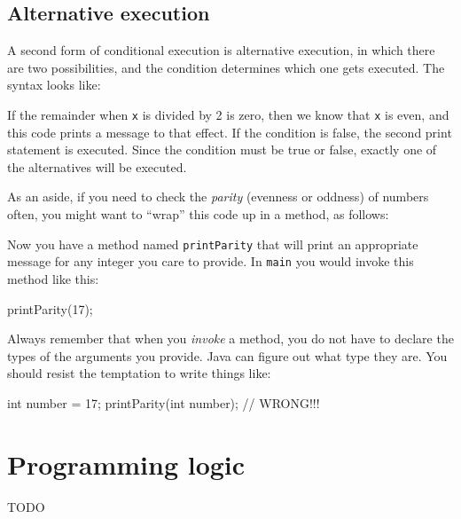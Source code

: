 \subsection{Alternative execution}
\label{alternative}


A second form of conditional execution is alternative execution, in which there are two possibilities, and the condition determines which one gets executed.
The syntax looks like:


If the remainder when {\tt x} is divided by 2 is zero, then we know that {\tt x} is even, and this code prints a message to that effect.
If the condition is false, the second print statement is executed.
Since the condition must be true or false, exactly one of the alternatives will be executed.

As an aside, if you need to check the {\em parity} (evenness or oddness) of numbers often, you might want to ``wrap'' this code up in a method, as follows:


Now you have a method named {\tt printParity} that will print an appropriate message for any integer you care to provide.
In {\tt main} you would invoke this method like this:

\begin{code}
    printParity(17);
\end{code}

Always remember that when you {\em invoke} a method, you do not have to declare the types of the arguments you provide.
Java can figure out what type they are.
You should resist the temptation to write things like:

\begin{code}
    int number = 17;
    printParity(int number);        // WRONG!!!
\end{code}


\section{Programming logic}
TODO

